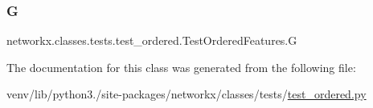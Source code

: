 \subsubsection{\texorpdfstring{G}{G}}
{\footnotesize\ttfamily networkx.\+classes.\+tests.\+test\+\_\+ordered.\+Test\+Ordered\+Features.\+G}



The documentation for this class was generated from the following file\+:\begin{DoxyCompactItemize}
\item 
venv/lib/python3./site-\/packages/networkx/classes/tests/\hyperlink{test__ordered_8py}{test\+\_\+ordered.\+py}\end{DoxyCompactItemize}
